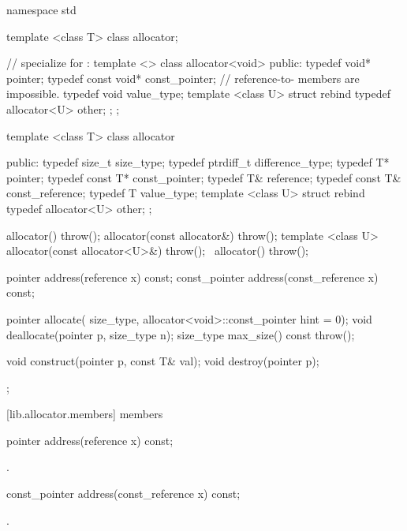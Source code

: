 %
\begin{codeblock}
namespace std {
  template <class T> class allocator;

  // specialize for :
  template <> class allocator<void> {
  public:
    typedef void*       pointer;
    typedef const void* const_pointer;
    // reference-to- members are impossible.
    typedef void  value_type;
    template <class U> struct rebind { typedef allocator<U> other; };
  };

  template <class T> class allocator {
   public:
    typedef size_t    size_type;
    typedef ptrdiff_t difference_type;
    typedef T*        pointer;
    typedef const T*  const_pointer;
    typedef T&        reference;
    typedef const T&  const_reference;
    typedef T         value_type;
    template <class U> struct rebind { typedef allocator<U> other; };

    allocator() throw();
    allocator(const allocator&) throw();
    template <class U> allocator(const allocator<U>&) throw();
   ~allocator() throw();

    pointer address(reference x) const;
    const_pointer address(const_reference x) const;

    pointer allocate(
      size_type, allocator<void>::const_pointer hint = 0);
    void deallocate(pointer p, size_type n);
    size_type max_size() const throw();

    void construct(pointer p, const T& val);
    void destroy(pointer p);
  };
}
\end{codeblock}

[lib.allocator.members]{ members}

\begin{itemdecl}
pointer address(reference x) const;
\end{itemdecl}

\begin{itemdescr}
\pnum
\returns {}.
\end{itemdescr}

\begin{itemdecl}
const_pointer address(const_reference x) const;
\end{itemdecl}

\begin{itemdescr}
\pnum
\returns {}.
\end{itemdescr}

